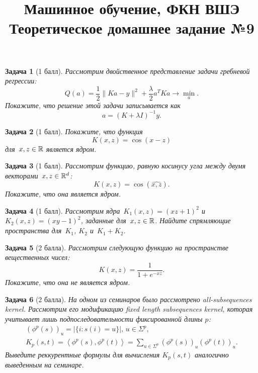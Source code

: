 \documentclass[12pt,fleqn]{article}
\title{Машинное обучение, ФКН ВШЭ\\Теоретическое домашнее задание №9}
\author{}
\date{}
\newtheorem{esProblem}{Задача}
\begin{document}
\maketitle

\begin{esProblem}[1 балл]
    Рассмотрим двойственное представление задачи гребневой регрессии:
    \[
        Q(a)
        =
        \frac{1}{2} \| K a - y \|^2 + \frac{\lambda}{2} a^T K a \to \min_a.
    \]
    Покажите, что решение этой задачи записывается как
    \[
        a = (K + \lambda I)^{-1} y.
    \]
\end{esProblem}

\begin{esProblem}[1 балл]
    Покажите, что функция
    \[
        K(x, z) = \cos(x - z)
    \]
    для~$x, z \in \mathbb{R}$ является ядром.
\end{esProblem}

\begin{esProblem}[1 балл]
    Рассмотрим функцию, равную косинусу угла между двумя векторами~$x, z \in \mathbb{R}^d$:
    \[
        K(x, z) = \cos(\widehat{x, z}).
    \]
    Покажите, что она является ядром.
\end{esProblem}

\begin{esProblem}[1 балл]
    Рассмотрим ядра~$K_1(x, z) = (xz + 1)^2$ и~$K_2(x, z) = (xy - 1)^2$,
    заданные для~$x, z \in \mathbb{R}$.
    Найдите спрямляющие пространства для~$K_1$, $K_2$ и~$K_1 + K_2$.
\end{esProblem}

\begin{esProblem}[2 балла]
    Рассмотрим следующую функцию на пространстве вещественных чисел:
    \[
        K(x, z) = \frac{1}{1 + e^{-xz}}.
    \]
    Покажите, что она не является ядром.
\end{esProblem}

\begin{esProblem}[2 балла]
	На одном из семинаров было рассмотрено all-subsequences kernel. Рассмотрим его модификацию fixed length subsequences kernel, которая учитывает лишь подпоследовательности фиксированной длины $p$:
	\begin{align*}
		\left(\phi^p(s) \right)_u = \left| \{i: s(i) = u \} \right|, \, u \in \Sigma^p,\\
		K_p(s, t) = \left\langle \phi^p(s), \phi^p(t) \right\rangle = \sum_{u \in \Sigma^p} (\phi^p(s))_u (\phi^p(t))_u.
	\end{align*}
	Выведите реккурентные формулы для вычисления $K_p(s, t)$ аналогично выведенным на семинаре.
\end{esProblem}
\end{document}
